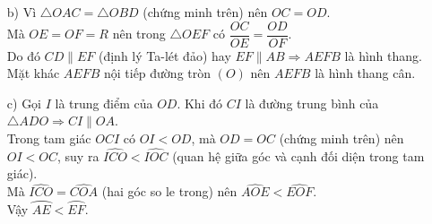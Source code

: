\begin{bt}
{{		}
		\begin{enumerate}
			\item[b)] Vì $\triangle OAC=\triangle OBD$ (chứng minh trên) nên $OC=OD$.\\
			Mà $OE=OF=R$ nên trong $\triangle OEF$ có $\dfrac{OC}{OE}=\dfrac{OD}{OF}$.\\
			Do đó $CD\parallel EF$ (định lý Ta-lét đảo) hay $EF\parallel AB \Rightarrow AEFB$ là hình thang.\\
			Mặt khác $AEFB$ nội tiếp đường tròn $(O)$ nên $AEFB$ là hình thang cân.
			\item[c)] Gọi $I$ là trung điểm của $OD$. Khi đó $CI$ là đường trung bình của $\triangle ADO \Rightarrow CI\parallel OA$.\\
			Trong tam giác $OCI$ có $OI<OD$, mà $OD=OC$ (chứng minh trên) nên $OI<OC$, suy ra $\widehat{ICO}<\widehat{IOC}$ (quan hệ giữa góc và cạnh đối diện trong tam giác).\\
			Mà $\widehat{ICO}=\widehat{COA}$ (hai góc so le trong) nên $\widehat{AOE}<\widehat{EOF}$.\\ Vậy $\wideparen{AE}<\wideparen{EF}$.
		\end{enumerate}
	}
\end{bt}


